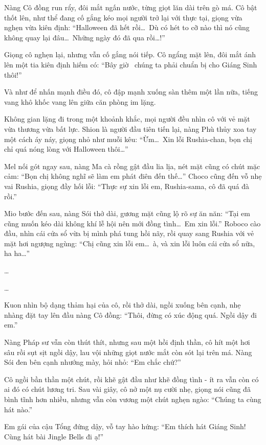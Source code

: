 \documentclass[../main.tex]{subfiles}
\begin{document}
Nàng Cô đồng run rẩy, đôi mắt ngấn nước, từng giọt lăn dài trên gò má. Cô bật thốt lên, như thể đang cố gắng kéo mọi người trở lại với thực tại, giọng vừa nghẹn vừa kiên định: ``Halloween đã hết rồi\dots\ Dù có hét to cỡ nào thì nó cũng không quay lại đâu\dots\ Những ngày đó đã qua rồi\dots!''


Giọng cô nghẹn lại, nhưng vẫn cố gắng nói tiếp. Cô ngẩng mặt lên, đôi mắt ánh lên một tia kiên định hiếm có: ``Bây giờ \hll\ chúng ta phải chuẩn bị cho Giáng Sinh thôi!''

Và như để nhấn mạnh điều đó, cô đập mạnh xuống sàn thêm một lần nữa, tiếng vang khô khốc vang lên giữa căn phòng im lặng.

Không gian lặng đi trong một khoảnh khắc, mọi người đều nhìn cô với vẻ mặt vừa thương vừa bất lực. Shion là người đầu tiên tiến lại, nàng Phù thủy xoa tay một cách áy náy, giọng nhỏ như muỗi kêu: ``Ừm\dots\ Xin lỗi Rushia-chan, bọn chị chỉ quá nóng lòng với Halloween thôi\dots''

Mel nối gót ngay sau, nàng Ma cà rồng gật đầu lia lịa, nét mặt cũng có chút mặc cảm: ``Bọn chị không nghĩ sẽ làm em phát điên đến thế\dots'' Choco cũng đến vỗ nhẹ vai Rushia, giọng đầy hối lỗi: ``Thực sự xin lỗi em, Rushia-sama, cô đã quá đà rồi.''

Mio bước đến sau, nàng Sói thở dài, gương mặt cũng lộ rõ sự ăn năn: ``Tại em cũng muốn kéo dài không khí lễ hội nên mới đồng tình\dots\ Em xin lỗi.'' Roboco cào đầu, nhìn cái cửa sổ vừa bị mình phá tung hồi nãy, rồi quay sang Rushia với vẻ mặt hơi ngượng ngùng: ``Chị cũng xin lỗi em\dots\ à, và xin lỗi luôn cái cửa sổ nữa, ha ha\dots''

\dots

\dots

Kuon nhìn bộ dạng thảm hại của cô, rồi thở dài, ngồi xuống bên cạnh, nhẹ nhàng đặt tay lên đầu nàng Cô đồng: ``Thôi, đừng có xúc động quá. Ngồi dậy đi em.''

Nàng Pháp sư vẫn còn thút thít, nhưng sau một hồi định thần, cô hít một hơi sâu rồi sụt sịt ngồi dậy, lau vội những giọt nước mắt còn sót lại trên má. Nàng Sói đen bên cạnh nhướng mày, hỏi nhỏ: ``Em chắc chứ?''

Cô ngồi bần thần một chút, rồi khẽ gật đầu như khẽ đồng tình - ít ra vẫn còn có ai đó có chút lương tri. Sau vài giây, cô nở một nụ cười nhẹ, giọng nói cũng đã bình tĩnh hơn nhiều, nhưng vẫn còn vương một chút nghẹn ngào: ``Chúng ta cùng hát nào.''

Em gái của cậu Tổng đứng dậy, vỗ tay hào hứng: ``Em thích hát Giáng Sinh! Cùng hát bài Jingle Bells đi ạ!''
\end{document}
